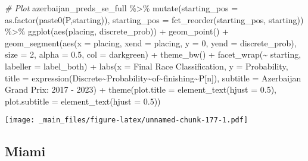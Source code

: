 \documentclass[
]{book}
\newenvironment{Shaded}{\begin{snugshade}}{\end{snugshade}}
\newcommand{\AttributeTok}[1]{\textcolor[rgb]{0.77,0.63,0.00}{#1}}
\newcommand{\CommentTok}[1]{\textcolor[rgb]{0.56,0.35,0.01}{\textit{#1}}}
\newcommand{\DecValTok}[1]{\textcolor[rgb]{0.00,0.00,0.81}{#1}}
\newcommand{\FloatTok}[1]{\textcolor[rgb]{0.00,0.00,0.81}{#1}}
\newcommand{\FunctionTok}[1]{\textcolor[rgb]{0.00,0.00,0.00}{#1}}
\newcommand{\NormalTok}[1]{#1}
\newcommand{\SpecialCharTok}[1]{\textcolor[rgb]{0.00,0.00,0.00}{#1}}
\newcommand{\StringTok}[1]{\textcolor[rgb]{0.31,0.60,0.02}{#1}}
\begin{document}
\begin{Shaded}
\begin{Highlighting}[]
\CommentTok{\# Plot}
\NormalTok{azerbaijan\_preds\_se\_full }\SpecialCharTok{\%\textgreater{}\%}
  \FunctionTok{mutate}\NormalTok{(}\AttributeTok{starting\_pos =} \FunctionTok{as.factor}\NormalTok{(}\FunctionTok{paste0}\NormalTok{(}\StringTok{\textquotesingle{}P\textquotesingle{}}\NormalTok{,starting)),}
         \AttributeTok{starting\_pos =} \FunctionTok{fct\_reorder}\NormalTok{(starting\_pos, starting)) }\SpecialCharTok{\%\textgreater{}\%}
  \FunctionTok{ggplot}\NormalTok{(}\FunctionTok{aes}\NormalTok{(placing, discrete\_prob)) }\SpecialCharTok{+}
  \FunctionTok{geom\_point}\NormalTok{() }\SpecialCharTok{+}
  \FunctionTok{geom\_segment}\NormalTok{(}\FunctionTok{aes}\NormalTok{(}\AttributeTok{x =}\NormalTok{ placing, }\AttributeTok{xend =}\NormalTok{ placing, }\AttributeTok{y =} \DecValTok{0}\NormalTok{, }\AttributeTok{yend =}\NormalTok{ discrete\_prob),}
               \AttributeTok{size =} \DecValTok{2}\NormalTok{, }\AttributeTok{alpha =} \FloatTok{0.5}\NormalTok{, }\AttributeTok{col =} \StringTok{\textquotesingle{}darkgreen\textquotesingle{}}\NormalTok{) }\SpecialCharTok{+}
  \FunctionTok{theme\_bw}\NormalTok{() }\SpecialCharTok{+}
  \FunctionTok{facet\_wrap}\NormalTok{(}\SpecialCharTok{\textasciitilde{}}\NormalTok{ starting, }\AttributeTok{labeller =}\NormalTok{ label\_both) }\SpecialCharTok{+}
  \FunctionTok{labs}\NormalTok{(}\AttributeTok{x =} \StringTok{\textquotesingle{}Final Race Classification\textquotesingle{}}\NormalTok{,}
       \AttributeTok{y =} \StringTok{\textquotesingle{}Probability\textquotesingle{}}\NormalTok{,}
       \AttributeTok{title =} \FunctionTok{expression}\NormalTok{(Discrete}\SpecialCharTok{\textasciitilde{}}\NormalTok{Probability}\SpecialCharTok{\textasciitilde{}}\NormalTok{of}\SpecialCharTok{\textasciitilde{}}\NormalTok{finishing}\SpecialCharTok{\textasciitilde{}}\NormalTok{P[n]),}
       \AttributeTok{subtitle =} \StringTok{\textquotesingle{}Azerbaijan Grand Prix: 2017 {-} 2023\textquotesingle{}}\NormalTok{) }\SpecialCharTok{+}
  \FunctionTok{theme}\NormalTok{(}\AttributeTok{plot.title =} \FunctionTok{element\_text}\NormalTok{(}\AttributeTok{hjust =} \FloatTok{0.5}\NormalTok{),}
        \AttributeTok{plot.subtitle =} \FunctionTok{element\_text}\NormalTok{(}\AttributeTok{hjust =} \FloatTok{0.5}\NormalTok{)) }
\end{Highlighting}
\end{Shaded}

\texttt{[image: \_main\_files/figure-latex/unnamed-chunk-177-1.pdf]}

\hypertarget{miami}{%
\subsection{Miami}\label{miami}}
\end{document}

